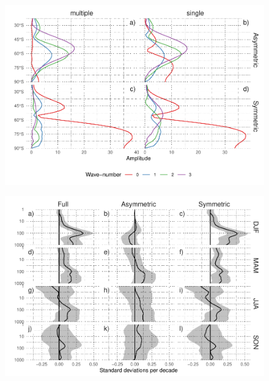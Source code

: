 \documentclass[]{ametsocV5}
\begin{document}
\begin{figure}
\includegraphics{A7-1} \label{fig:A7}
\end{figure}

\begin{figure}
\includegraphics{A8-1} \label{fig:A8}
\end{figure}
\end{document}
